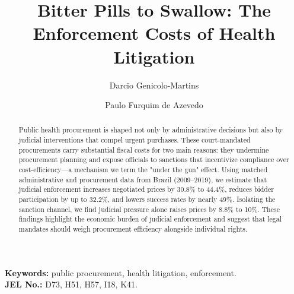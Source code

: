 \documentclass[12 pt]{elsarticle}
\begin{document}
\begin{frontmatter}
\title{\textbf{Bitter Pills to Swallow: The Enforcement Costs of Health Litigation}}
\author[INSPER]{Darcio Genicolo-Martins}  
\author[INSPER]{Paulo Furquim de Azevedo} 
\address[INSPER]{INSPER}

\begin{abstract}
Public health procurement is shaped not only by administrative decisions but also by judicial interventions that compel urgent purchases. These court-mandated procurements carry substantial fiscal costs for two main reasons: they undermine procurement planning and expose officials to sanctions that incentivize compliance over cost-efficiency—a mechanism we term the "under the gun" effect. Using matched administrative and procurement data from Brazil (2009–2019), we estimate that judicial enforcement increases negotiated prices by 30.8\% to 44.4\%, reduces bidder participation by up to 32.2\%, and lowers success rates by nearly 49\%. Isolating the sanction channel, we find judicial pressure alone raises prices by 8.8\% to 10\%. These findings highlight the economic burden of judicial enforcement and suggest that legal mandates should weigh procurement efficiency alongside individual rights.
\end{abstract}

\end{frontmatter}
\textbf{Keywords:} public procurement, health litigation, enforcement.\\
\textbf{JEL No.:} D73, H51, H57, I18, K41.

\bigskip
\clearpage

\begin{sloppypar}




%



\clearpage


\clearpage
%

\end{sloppypar}
\end{document}

